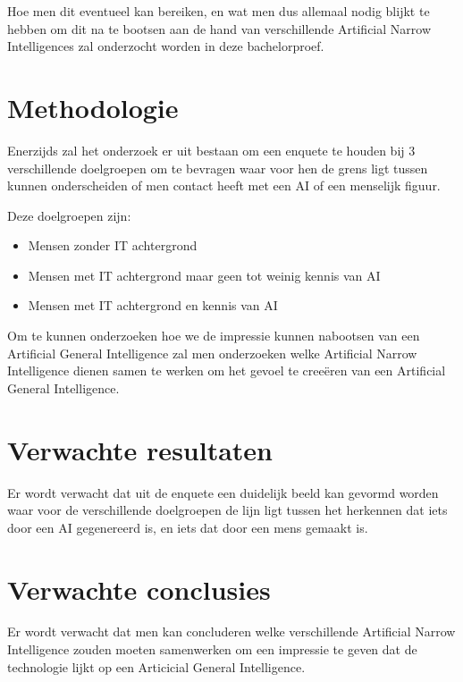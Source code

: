 Hoe men dit eventueel kan bereiken, en wat men dus allemaal nodig blijkt te hebben om dit na te bootsen aan de hand van verschillende Artificial Narrow Intelligences zal onderzocht worden in deze bachelorproef.

\autocite{shevlin2019limits}

\newpage


\section{Methodologie}
\label{sec:methodologie}
Enerzijds zal het onderzoek er uit bestaan om een enquete te houden bij 3 verschillende doelgroepen om te bevragen waar voor hen de grens ligt tussen kunnen onderscheiden of men contact heeft met een AI of een menselijk figuur. 

Deze doelgroepen zijn:

\begin{itemize}
    \item Mensen zonder IT achtergrond
    \item Mensen met IT achtergrond maar geen tot weinig kennis van AI
    \item Mensen met IT achtergrond en kennis van AI
\end{itemize}

Om te kunnen onderzoeken hoe we de impressie kunnen nabootsen van een Artificial General Intelligence zal men onderzoeken welke Artificial Narrow Intelligence dienen samen te werken om het gevoel te creeëren van een Artificial General Intelligence.

\section{Verwachte resultaten}
\label{sec:verwachte_resultaten}

Er wordt verwacht dat uit de enquete een duidelijk beeld kan gevormd worden waar voor de verschillende doelgroepen de lijn ligt tussen het herkennen dat iets door een AI gegenereerd is, en iets dat door een mens gemaakt is.

\section{Verwachte conclusies}
\label{sec:verwachte_conclusies}

Er wordt verwacht dat men kan concluderen welke verschillende Artificial Narrow Intelligence zouden moeten samenwerken om een impressie te geven dat de technologie lijkt op een Articicial General Intelligence.



